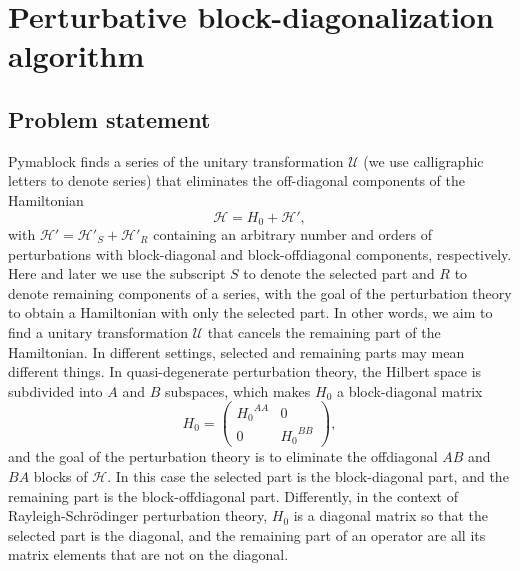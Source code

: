 \section{Perturbative block-diagonalization algorithm}

\subsection{Problem statement}

Pymablock finds a series of the unitary transformation $\mathcal{U}$ (we use calligraphic letters to denote series) that eliminates the off-diagonal components of the Hamiltonian
%
\begin{equation}
\label{eq:hamiltonian}
\mathcal{H} = H_0 + \mathcal{H}',
\end{equation}
%
with $\mathcal{H}' = \mathcal{H}'_{S} + \mathcal{H}'_{R}$ containing an arbitrary number and orders of perturbations with block-diagonal and block-offdiagonal components, respectively.
Here and later we use the subscript $S$ to denote the selected part and $R$ to denote remaining components of a series, with the goal of the perturbation theory to obtain a Hamiltonian with only the selected part.
In other words, we aim to find a unitary transformation $\mathcal{U}$ that cancels the remaining part of the Hamiltonian.
In different settings, selected and remaining parts may mean different things.
In quasi-degenerate perturbation theory, the Hilbert space is subdivided into $A$ and $B$ subspaces, which makes $H_0$ a block-diagonal matrix
\begin{equation}
  H_0 = \begin{pmatrix}
    {H_0}^{AA} & 0 \\
    0 & {H_0}^{BB}
    \end{pmatrix},
\end{equation}
and the goal of the perturbation theory is to eliminate the offdiagonal $AB$ and $BA$ blocks of $\mathcal{H}$.
In this case the selected part is the block-diagonal part, and the remaining part is the block-offdiagonal part.
Differently, in the context of Rayleigh-Schr\"odinger perturbation theory, $H_0$ is a diagonal matrix so that the selected part is the diagonal, and the remaining part of an operator are all its matrix elements that are not on the diagonal.

